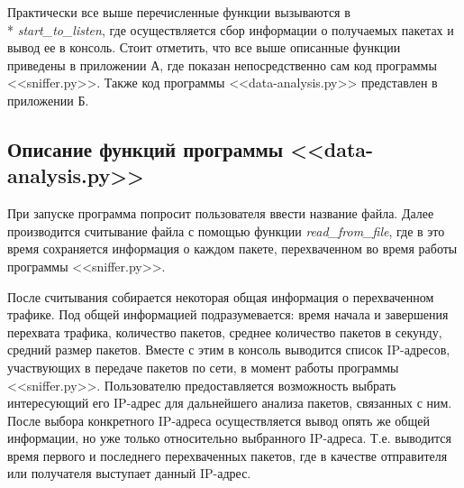 \documentclass[bachelor, och, coursework]{SCWorks}
\begin{document}
    Практически все выше перечисленные функции вызываются в \\* \textit{start\_to\_listen}, где осуществляется сбор информации
    о получаемых пакетах и вывод ее в консоль. Стоит отметить, что все выше описанные функции приведены в приложении А, где
    показан непосредственно сам код программы <<sniffer.py>>. Также код программы <<data-analysis.py>> представлен в приложении Б.

  \subsection{Описание функций программы <<data-analysis.py>>}

  При запуске программа попросит пользователя ввести название файла. Далее производится считывание файла с помощью функции \textit{read\_from\_file},
  где в это время сохраняется информация о каждом пакете, перехваченном во время работы программы <<sniffer.py>>.


  После считывания собирается некоторая общая информация о перехваченном трафике. Под общей информацией подразумевается: время начала и завершения
  перехвата трафика, количество пакетов, среднее количество пакетов в секунду, средний размер пакетов. Вместе с этим в консоль выводится список 
  IP-адресов, участвующих в передаче пакетов по сети, в момент работы программы <<sniffer.py>>. Пользователю предоставляется возможность выбрать
  интересующий его IP-адрес для дальнейшего анализа пакетов, связанных с ним. После выбора конкретного IP-адреса осуществляется вывод опять же общей
  информации, но уже только относительно выбранного IP-адреса. Т.е. выводится время первого и последнего перехваченных пакетов, где в качестве отправителя
  или получателя выступает данный IP-адрес. 
  
\end{document}
